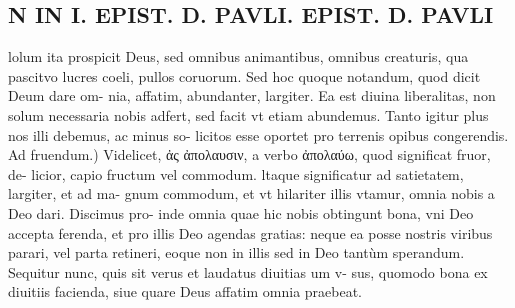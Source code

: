 \documentclass{article}
\begin{document}
\begin{pages}
\section*{N IN I. EPIST. D. PAVLI. EPIST. D. PAVLI }
\marginpar{[ p.132 ]}\pstart lolum ita prospicit Deus, sed omnibus animantibus, omnibus creaturis, qua pascitvo lucres coeli, pullos coruorum. Sed hoc quoque notandum, quod dicit Deum dare om- nia, affatim, abundanter, largiter. Ea est diuina liberalitas, non solum necessaria nobis adfert, sed facit vt etiam abundemus. Tanto igitur plus nos illi debemus, ac minus so- licitos esse oportet pro terrenis opibus congerendis.  \pend\pstart Ad fruendum.) Videlicet, ἀς ἀπολαυσιν, a verbo ἀπολαύω, quod significat fruor, de- licior, capio fructum vel commodum. ltaque significatur ad satietatem, largiter, et ad ma- gnum commodum, et vt hilariter illis vtamur, omnia nobis a Deo dari. Discimus pro- inde omnia quae hic nobis obtingunt bona, vni Deo accepta ferenda, et pro illis Deo agendas gratias: neque ea posse nostris viribus parari, vel parta retineri, eoque non in illis sed in Deo tantùm sperandum. Sequitur nunc, quis sit verus et laudatus diuitias um v- sus, quomodo bona ex diuitiis facienda, siue quare Deus affatim omnia praebeat.  \pend
{}
{}

\end{pages}
\end{document}
